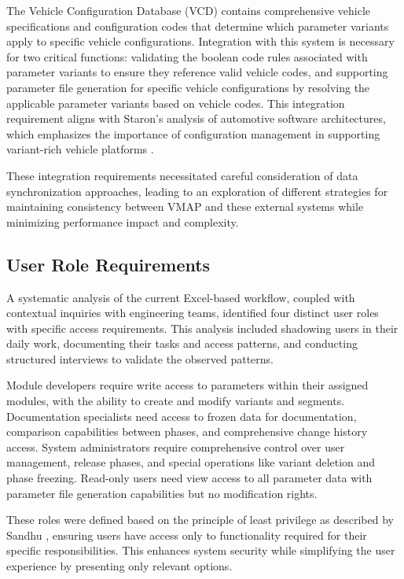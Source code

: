The Vehicle Configuration Database (VCD) contains comprehensive vehicle specifications and configuration codes that determine which parameter variants apply to specific vehicle configurations. Integration with this system is necessary for two critical functions: validating the boolean code rules associated with parameter variants to ensure they reference valid vehicle codes, and supporting parameter file generation for specific vehicle configurations by resolving the applicable parameter variants based on vehicle codes. This integration requirement aligns with Staron's analysis of automotive software architectures, which emphasizes the importance of configuration management in supporting variant-rich vehicle platforms \cite{staron2021automotive}.

These integration requirements necessitated careful consideration of data synchronization approaches, leading to an exploration of different strategies for maintaining consistency between VMAP and these external systems while minimizing performance impact and complexity.

\subsection{User Role Requirements}
\label{subsec:user-role-requirements}

A systematic analysis of the current Excel-based workflow, coupled with contextual inquiries with engineering teams, identified four distinct user roles with specific access requirements. This analysis included shadowing users in their daily work, documenting their tasks and access patterns, and conducting structured interviews to validate the observed patterns.

Module developers require write access to parameters within their assigned modules, with the ability to create and modify variants and segments. Documentation specialists need access to frozen data for documentation, comparison capabilities between phases, and comprehensive change history access. System administrators require comprehensive control over user management, release phases, and special operations like variant deletion and phase freezing. Read-only users need view access to all parameter data with parameter file generation capabilities but no modification rights.

These roles were defined based on the principle of least privilege as described by Sandhu \cite{sandhu1998role}, ensuring users have access only to functionality required for their specific responsibilities. This enhances system security while simplifying the user experience by presenting only relevant options.

